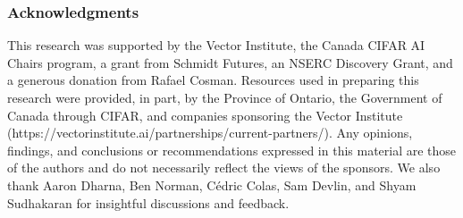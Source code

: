 \subsubsection*{Acknowledgments}
This research was supported by the Vector Institute, the Canada CIFAR AI Chairs program, a grant from Schmidt Futures, an NSERC Discovery Grant, and a generous donation from Rafael Cosman. Resources used in preparing this research were provided, in part, by the Province of Ontario, the Government of Canada through CIFAR, and companies sponsoring the Vector Institute (https://vectorinstitute.ai/partnerships/current-partners/). Any opinions, findings, and conclusions or recommendations expressed in this material are those of the authors and do not necessarily reflect the views of the sponsors. We also thank Aaron Dharna, Ben Norman, C\'edric Colas, Sam Devlin, and Shyam Sudhakaran for insightful discussions and feedback.
